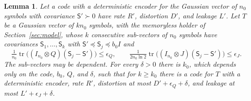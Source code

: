 \documentclass[11pt,onecolumn]{IEEEtran}
\newtheorem{lemma}[theorem]{Lemma}
\newcommand{\tr}{\operatorname{tr}}
\begin{document}
\begin{lemma}\label{lem:seeds}
Let a code with a deterministic encoder for the Gaussian vector of
$n_0$ symbols with covariance $\mathsf S'\succ0$ have rate $R'$,
distortion $D'$, and leakage $L'$. Let $T$ be a Gaussian vector of
$kn_0$ symbols, with the memoryless holder of Section~\ref{sec:model},
whose $k$ consecutive sub-vectors of $n_0$ symbols have covariances
$\mathsf S_1,\dots,\mathsf S_k$ with
$\mathsf S'\preceq\mathsf S_j\preceq b_0I$ and
\[
\tfrac1{n_0}\tr\bigl((I_{n_0}\otimes Q)(\mathsf S_j-\mathsf S')\bigr)\le\epsilon_Q,\qquad
\tfrac1{2n_0\ln2}\tr\bigl((I_{n_0}\otimes J)(\mathsf S_j-\mathsf S')\bigr)\le\epsilon_J .
\]
The sub-vectors may be dependent. For every $\delta>0$ there is $k_0$,
which depends only on the code, $b_0$, $Q$, and $\delta$, such that for
$k\ge k_0$ there is a code for $T$ with a deterministic encoder, rate
$R'$, distortion at most $D'+\epsilon_Q+\delta$, and leakage at most
$L'+\epsilon_J+\delta$.
\end{lemma}
\end{document}
